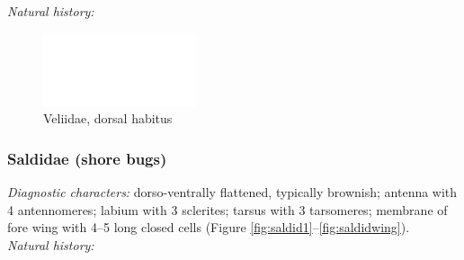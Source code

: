 \documentclass[letterpaper, 11pt]{article}
\begin{document}
\noindent{}\textit{Natural history:} \\

\begin{figure}[ht!]
 \centering
 \includegraphics[width=0.4\textwidth]{image14}
 \caption{Veliidae, dorsal habitus}
 \label{fig:veliid1}
\end{figure}

\subsubsection{Saldidae (shore bugs)}
\noindent{}\textit{Diagnostic characters:} dorso-ventrally flattened, typically brownish; antenna with 4 antennomeres; labium with 3 sclerites; tarsus with 3 tarsomeres; membrane of fore wing with 4--5 long closed cells (Figure \ref{fig:saldid1}--\ref{fig:saldidwing}).\\

\noindent{}\textit{Natural history:} \\
\end{document}
